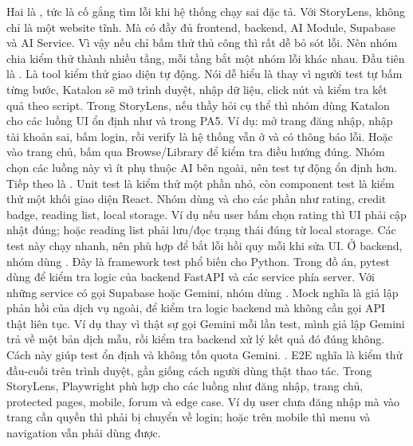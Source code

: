 \markdownRendererUlItem Hai là , tức là cố gắng tìm lỗi khi hệ thống chạy sai đặc tả.\markdownRendererUlItemEnd 
\markdownRendererUlEndTight \markdownRendererInterblockSeparator
{}Với StoryLens, không chỉ là một website tĩnh. Mà có đầy đủ frontend, backend, AI Module, Supabase và AI Service. Vì vậy nếu chỉ bấm thử thủ công thì rất dễ bỏ sót lỗi. Nên nhóm chia kiểm thử thành nhiều tầng, mỗi tầng bắt một nhóm lỗi khác nhau.\markdownRendererParagraphSeparator
{}Đầu tiên là . Là tool kiểm thử giao diện tự động. Nói dễ hiểu là thay vì người test tự bấm từng bước, Katalon sẽ mở trình duyệt, nhập dữ liệu, click nút và kiểm tra kết quả theo script.\markdownRendererParagraphSeparator
{}Trong StoryLens, nếu thầy hỏi cụ thể thì nhóm dùng Katalon cho các luồng UI ổn định như  và  trong PA5. Ví dụ: mở trang đăng nhập, nhập tài khoản sai, bấm login, rồi verify là hệ thống vẫn ở  và có thông báo lỗi. Hoặc vào trang chủ, bấm qua Browse/Library để kiểm tra điều hướng đúng. Nhóm chọn các luồng này vì ít phụ thuộc AI bên ngoài, nên test tự động ổn định hơn.\markdownRendererParagraphSeparator
{}Tiếp theo là . Unit test là kiểm thử một phần nhỏ, còn component test là kiểm thử một khối giao diện React. Nhóm dùng  và  cho các phần như rating, credit badge, reading list, local storage. Ví dụ nếu user bấm chọn rating thì UI phải cập nhật đúng; hoặc reading list phải lưu/đọc trạng thái đúng từ local storage. Các test này chạy nhanh, nên phù hợp để bắt lỗi hồi quy mỗi khi sửa UI.\markdownRendererParagraphSeparator
{}Ở backend, nhóm dùng . Đây là framework test phổ biến cho Python. Trong đồ án, pytest dùng để kiểm tra logic của backend FastAPI và các service phía server. Với những service có gọi Supabase hoặc Gemini, nhóm dùng . Mock nghĩa là giả lập phản hồi của dịch vụ ngoài, để kiểm tra logic backend mà không cần gọi API thật liên tục. Ví dụ thay vì thật sự gọi Gemini mỗi lần test, mình giả lập Gemini trả về một bản dịch mẫu, rồi kiểm tra backend xử lý kết quả đó đúng không. Cách này giúp test ổn định và không tốn quota Gemini.\markdownRendererParagraphSeparator
{}. E2E nghĩa là kiểm thử đầu-cuối trên trình duyệt, gần giống cách người dùng thật thao tác. Trong StoryLens, Playwright phù hợp cho các luồng như đăng nhập, trang chủ, protected pages, mobile, forum và edge case. Ví dụ user chưa đăng nhập mà vào trang cần quyền thì phải bị chuyển về login; hoặc trên mobile thì menu và navigation vẫn phải dùng được.\markdownRendererParagraphSeparator
